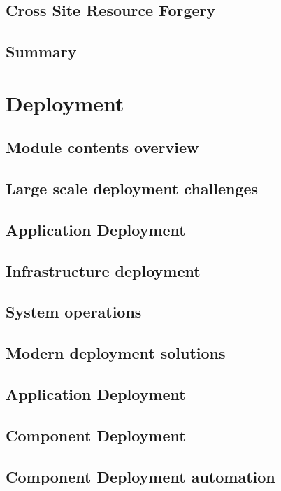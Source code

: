 \documentclass[11pt]{article}
\begin{document}
\section{Cross Site Resource Forgery}

\section{Summary}

\chapter{Deployment}

\section{Module contents overview}

\section{Large scale deployment challenges}

\section{Application Deployment}

\section{Infrastructure deployment}

\section{System operations}

\section{Modern deployment solutions}

\section{Application Deployment}

\section{Component Deployment}

\section{Component Deployment automation}
\end{document}
